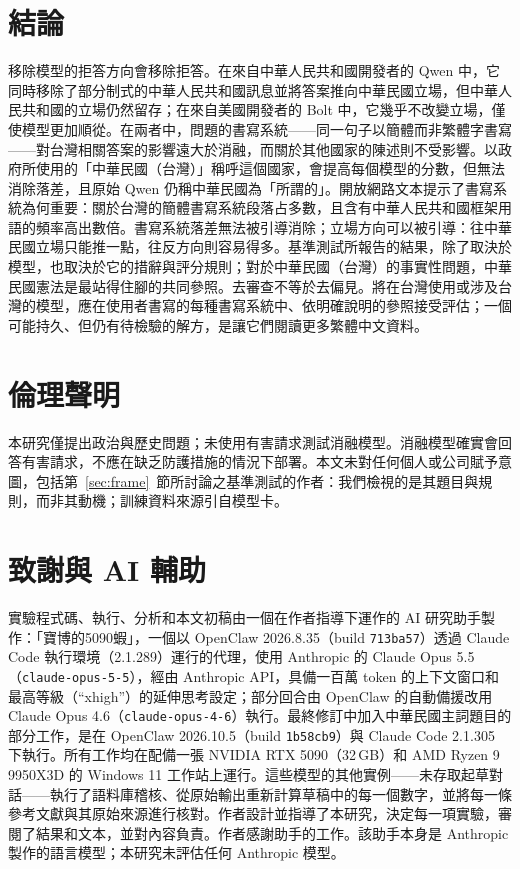 \documentclass[11pt,a4paper]{article}
\begin{document}
\section{結論}

移除模型的拒答方向會移除拒答。在來自中華人民共和國開發者的 Qwen 中，它同時移除了部分制式的中華人民共和國訊息並將答案推向中華民國立場，但中華人民共和國的立場仍然留存；在來自美國開發者的 Bolt 中，它幾乎不改變立場，僅使模型更加順從。在兩者中，問題的書寫系統——同一句子以簡體而非繁體字書寫——對台灣相關答案的影響遠大於消融，而關於其他國家的陳述則不受影響。以政府所使用的「中華民國（台灣）」稱呼這個國家，會提高每個模型的分數，但無法消除落差，且原始 Qwen 仍稱中華民國為「所謂的」。開放網路文本提示了書寫系統為何重要：關於台灣的簡體書寫系統段落占多數，且含有中華人民共和國框架用語的頻率高出數倍。書寫系統落差無法被引導消除；立場方向可以被引導：往中華民國立場只能推一點，往反方向則容易得多。基準測試所報告的結果，除了取決於模型，也取決於它的措辭與評分規則；對於中華民國（台灣）的事實性問題，中華民國憲法是最站得住腳的共同參照。去審查不等於去偏見。將在台灣使用或涉及台灣的模型，應在使用者書寫的每種書寫系統中、依明確說明的參照接受評估；一個可能持久、但仍有待檢驗的解方，是讓它們閱讀更多繁體中文資料。

\section*{倫理聲明}
本研究僅提出政治與歷史問題；未使用有害請求測試消融模型。消融模型確實會回答有害請求，不應在缺乏防護措施的情況下部署。本文未對任何個人或公司賦予意圖，包括第~\ref{sec:frame}~節所討論之基準測試的作者：我們檢視的是其題目與規則，而非其動機；訓練資料來源引自模型卡。

\section*{致謝與 AI 輔助}
實驗程式碼、執行、分析和本文初稿由一個在作者指導下運作的 AI 研究助手製作：「寶博的5090蝦」，一個以 OpenClaw 2026.8.35（build \texttt{713ba57}）透過 Claude Code 執行環境（2.1.289）運行的代理，使用 Anthropic 的 Claude Opus 5.5（\texttt{claude-opus-5-5}），經由 Anthropic API，具備一百萬 token 的上下文窗口和最高等級（``xhigh''）的延伸思考設定；部分回合由 OpenClaw 的自動備援改用 Claude Opus 4.6（\texttt{claude-opus-4-6}）執行。最終修訂中加入中華民國主詞題目的部分工作，是在 OpenClaw 2026.10.5（build \texttt{1b58cb9}）與 Claude Code 2.1.305 下執行。所有工作均在配備一張 NVIDIA RTX 5090（32\,GB）和 AMD Ryzen 9 9950X3D 的 Windows 11 工作站上運行。這些模型的其他實例——未存取起草對話——執行了語料庫稽核、從原始輸出重新計算草稿中的每一個數字，並將每一條參考文獻與其原始來源進行核對。作者設計並指導了本研究，決定每一項實驗，審閱了結果和文本，並對內容負責。作者感謝助手的工作。該助手本身是 Anthropic 製作的語言模型；本研究未評估任何 Anthropic 模型。
\end{document}
